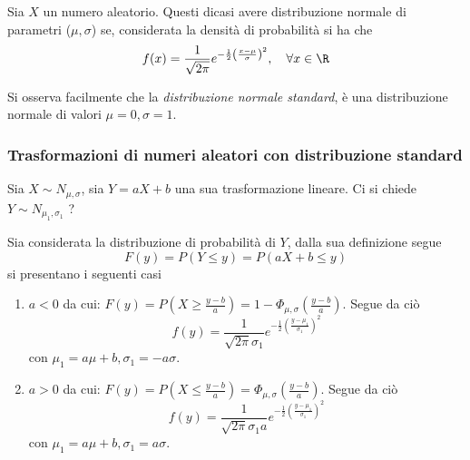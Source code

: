 \documentclass{subfiles}
\begin{document}
Sia \(X\) un numero aleatorio. Questi dicasi avere distribuzione normale di parametri (\(\mu, \sigma\)) se, considerata la densità di probabilità si ha che
\[
    f(x) = \frac{1}{\sqrt{2 \pi}} e^{- \frac{1}{2} \left(\frac{x - \mu}{\sigma}\right)^{2}}, \quad \forall x \in \R
\]

\begin{Remark*}
    Si osserva facilmente che la \emph{distribuzione normale standard}, è una distribuzione normale di valori \(\mu = 0, \sigma = 1\).
\end{Remark*}

\subsubsection{Trasformazioni di numeri aleatori con distribuzione standard}
Sia \(X \sim N_{\mu, \sigma}\), sia \(Y = aX + b\) una sua trasformazione lineare.
\noindent Ci si chiede \(Y \sim N_{\mu_{1}, \sigma_{1}}\) ?

\noindent Sia considerata la distribuzione di probabilità di \(Y\), dalla sua definizione segue
\[
    F(y) = P(Y \le y) = P(aX + b \le y)
\]
\noindent si presentano i seguenti casi
\begin{enumerate}
    \item \(a < 0\) da cui: \(F(y) = P(X \ge \tfrac{y - b}{a}) = 1 - \Phi_{\mu, \sigma}(\tfrac{y - b}{a})\).
          Segue da ciò
          \[
              f(y) = \frac{1}{\sqrt{2\pi}\sigma_{1}} e^{- \frac{1}{2} \left( \frac{y - \mu_{1}}{\sigma_{1}} \right)^{2}}
          \]
          con \(\mu_{1} = a\mu + b, \sigma_{1} = -a\sigma\).

    \item \(a > 0\) da cui: \(F(y) = P(X \le \tfrac{y - b}{a}) = \Phi_{\mu, \sigma}(\tfrac{y - b}{a})\).
          Segue da ciò
          \[
              f(y) = \frac{1}{\sqrt{2\pi}\sigma_{1}a} e^{- \frac{1}{2} \left( \frac{y - \mu_{1}}{\sigma_{1}} \right)^{2}}
          \]
          con \(\mu_{1} = a\mu + b, \sigma_{1} = a\sigma\).
\end{enumerate}
\clearpage
\end{document}
